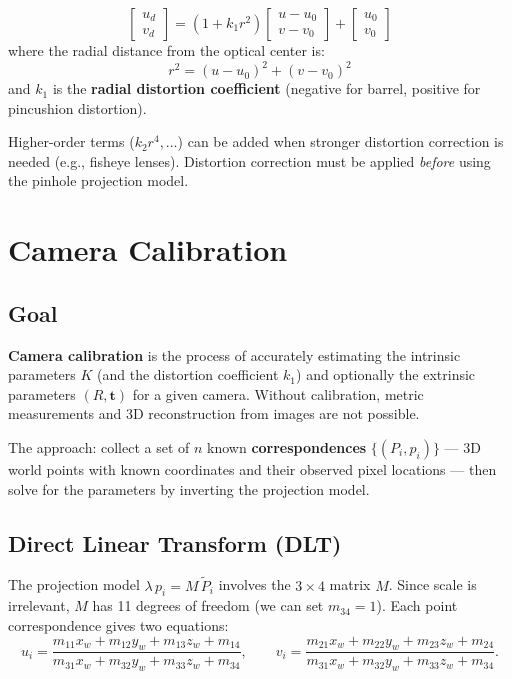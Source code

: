 \documentclass[11pt,a4paper]{article}
\theoremstyle{definition}
\theoremstyle{plain}
\theoremstyle{remark}
\newcommand{\p}[1]{\mathbf{#1}}             %
\begin{document}
\begin{tcolorbox}[colback=blue!5!white,colframe=blue!75!black,title=\textbf{Radial Distortion Model}]
\[
\begin{bmatrix} u_d \\ v_d \end{bmatrix}
= (1 + k_1 r^2)\begin{bmatrix} u - u_0 \\ v - v_0 \end{bmatrix} + \begin{bmatrix} u_0 \\ v_0 \end{bmatrix}
\]
where the radial distance from the optical center is:
\[
r^2 = (u - u_0)^2 + (v - v_0)^2
\]
and $k_1$ is the \textbf{radial distortion coefficient} (negative for barrel, positive for pincushion distortion).
\end{tcolorbox}

Higher-order terms ($k_2 r^4, \ldots$) can be added when stronger distortion correction is needed (e.g., fisheye lenses). Distortion correction must be applied \textit{before} using the pinhole projection model.

\section{Camera Calibration}

\subsection{Goal}

\textbf{Camera calibration} is the process of accurately estimating the intrinsic parameters $K$ (and the distortion coefficient $k_1$) and optionally the extrinsic parameters $(R, \p{t})$ for a given camera. Without calibration, metric measurements and 3D reconstruction from images are not possible.

The approach: collect a set of $n$ known \textbf{correspondences} $\{(P_i, p_i)\}$ — 3D world points with known coordinates and their observed pixel locations — then solve for the parameters by inverting the projection model.

\subsection{Direct Linear Transform (DLT)}

The projection model $\lambda\, p_i = M\, \tilde{P}_i$ involves the $3 \times 4$ matrix $M$. Since scale is irrelevant, $M$ has 11 degrees of freedom (we can set $m_{34} = 1$). Each point correspondence gives two equations:
\[
u_i = \frac{m_{11}x_w + m_{12}y_w + m_{13}z_w + m_{14}}{m_{31}x_w + m_{32}y_w + m_{33}z_w + m_{34}}, \qquad
v_i = \frac{m_{21}x_w + m_{22}y_w + m_{23}z_w + m_{24}}{m_{31}x_w + m_{32}y_w + m_{33}z_w + m_{34}}.
\]
\end{document}
